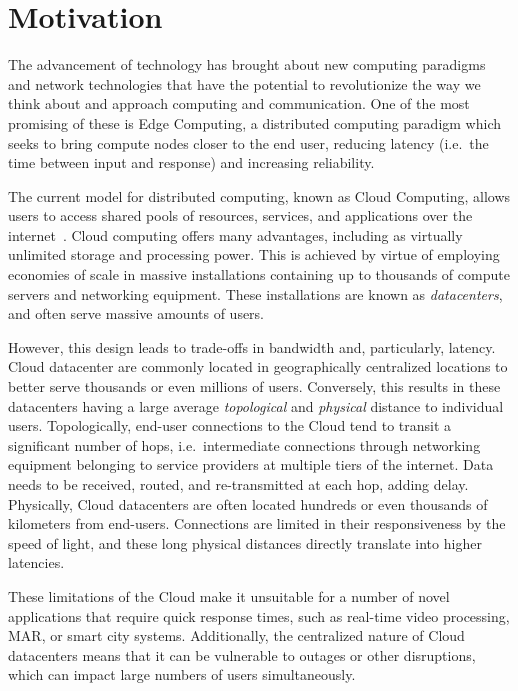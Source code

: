 \section{Motivation}

The advancement of technology has brought about new computing paradigms and network technologies that have the potential to revolutionize the way we think about and approach computing and communication.
One of the most promising of these is Edge Computing, a distributed computing paradigm which seeks to bring compute nodes closer to the end user, reducing latency (i.e.\ the time between input and response) and increasing reliability.

The current model for distributed computing, known as Cloud Computing, allows users to access shared pools of resources, services, and applications over the internet~\cite{gai2012towards}.
Cloud computing offers many advantages, including as virtually unlimited storage and processing power.
This is achieved by virtue of employing economies of scale in massive installations containing up to thousands of compute servers and networking equipment.
These installations are known as \emph{datacenters}, and often serve massive amounts of users.

However, this design leads to trade-offs in bandwidth and, particularly, latency.
Cloud datacenter are commonly located in geographically centralized locations to better serve thousands or even millions of users.
Conversely, this results in these datacenters having a large average \emph{topological} and \emph{physical} distance to individual users.
Topologically, end-user connections to the Cloud tend to transit a significant number of hops, i.e.\ intermediate connections through networking equipment belonging to service providers at multiple tiers of the internet.
Data needs to be received, routed, and re-transmitted at each hop, adding delay.
Physically, Cloud datacenters are often located hundreds or even thousands of kilometers from end-users.
Connections are limited in their responsiveness by the speed of light, and these long physical distances directly translate into higher latencies.

These limitations of the Cloud make it unsuitable for a number of novel applications that require quick response times, such as real-time video processing, \gls{MAR}, or smart city systems.
Additionally, the centralized nature of Cloud datacenters means that it can be vulnerable to outages or other disruptions, which can impact large numbers of users simultaneously.

